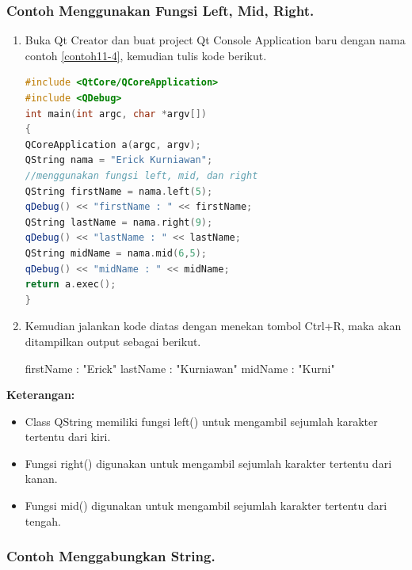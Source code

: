 \subsubsection*{Contoh  Menggunakan Fungsi Left, Mid, Right.}

\begin{enumerate}

\item
  Buka Qt Creator dan buat project Qt Console Application baru dengan
  nama contoh \ref{contoh11-4}, kemudian tulis kode berikut.

\begin{lstlisting}[language=c++,caption= Menggunakan Fungsi Left Mid Right, label=contoh11-4]
#include <QtCore/QCoreApplication>
#include <QDebug>
int main(int argc, char *argv[])
{
QCoreApplication a(argc, argv);
QString nama = "Erick Kurniawan";
//menggunakan fungsi left, mid, dan right
QString firstName = nama.left(5);
qDebug() << "firstName : " << firstName;
QString lastName = nama.right(9);
qDebug() << "lastName : " << lastName;
QString midName = nama.mid(6,5);
qDebug() << "midName : " << midName;
return a.exec();
}
\end{lstlisting}
\item
  Kemudian jalankan kode diatas dengan menekan tombol Ctrl+R, maka akan
  ditampilkan output sebagai berikut.

  \begin{lcverbatim}
firstName :  "Erick"
lastName :  "Kurniawan"
midName :  "Kurni"
\end{lcverbatim}
\end{enumerate}

\textbf{Keterangan:}

\begin{itemize}

\item
  Class QString memiliki fungsi left() untuk mengambil sejumlah karakter
  tertentu dari kiri.
\item
  Fungsi right() digunakan untuk mengambil sejumlah karakter tertentu
  dari kanan.
\item
  Fungsi mid() digunakan untuk mengambil sejumlah karakter tertentu dari
  tengah.
\end{itemize}

\subsubsection*{Contoh Menggabungkan String.}

